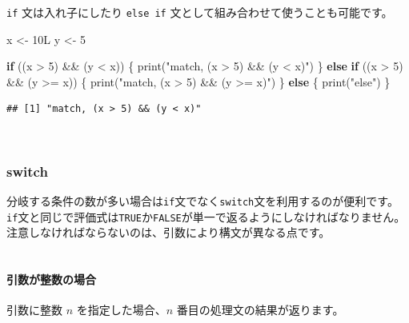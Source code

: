 \documentclass[
  12pt,
]{book}
\newenvironment{Shaded}{\begin{snugshade}}{\end{snugshade}}
\newcommand{\ControlFlowTok}[1]{\textcolor[rgb]{0.13,0.29,0.53}{\textbf{#1}}}
\newcommand{\DecValTok}[1]{\textcolor[rgb]{0.00,0.00,0.81}{#1}}
\newcommand{\FunctionTok}[1]{\textcolor[rgb]{0.00,0.00,0.00}{#1}}
\newcommand{\NormalTok}[1]{#1}
\newcommand{\OtherTok}[1]{\textcolor[rgb]{0.56,0.35,0.01}{#1}}
\newcommand{\SpecialCharTok}[1]{\textcolor[rgb]{0.00,0.00,0.00}{#1}}
\newcommand{\StringTok}[1]{\textcolor[rgb]{0.31,0.60,0.02}{#1}}
\begin{document}
\texttt{if} 文は入れ子にしたり \texttt{else\ if} 文として組み合わせて使うことも可能です。

\begin{Shaded}
\begin{Highlighting}[]
\NormalTok{x }\OtherTok{\textless{}{-}}\NormalTok{ 10L}
\NormalTok{y }\OtherTok{\textless{}{-}} \DecValTok{5}

\ControlFlowTok{if}\NormalTok{ ((x }\SpecialCharTok{\textgreater{}} \DecValTok{5}\NormalTok{) }\SpecialCharTok{\&\&}\NormalTok{ (y }\SpecialCharTok{\textless{}}\NormalTok{ x)) \{}
   \FunctionTok{print}\NormalTok{(}\StringTok{"match, (x \textgreater{} 5) \&\& (y \textless{} x)"}\NormalTok{)}
\NormalTok{\} }\ControlFlowTok{else} \ControlFlowTok{if}\NormalTok{ ((x }\SpecialCharTok{\textgreater{}} \DecValTok{5}\NormalTok{) }\SpecialCharTok{\&\&}\NormalTok{ (y }\SpecialCharTok{\textgreater{}=}\NormalTok{ x)) \{}
   \FunctionTok{print}\NormalTok{(}\StringTok{"match, (x \textgreater{} 5) \&\& (y \textgreater{}= x)"}\NormalTok{)}
\NormalTok{\} }\ControlFlowTok{else}\NormalTok{ \{}
   \FunctionTok{print}\NormalTok{(}\StringTok{"else"}\NormalTok{)}
\NormalTok{\}}
\end{Highlighting}
\end{Shaded}

\begin{verbatim}
## [1] "match, (x > 5) && (y < x)"
\end{verbatim}

　

\hypertarget{switch}{%
\subsubsection{switch}\label{switch}}

分岐する条件の数が多い場合は\texttt{if}文でなく\texttt{switch}文を利用するのが便利です。\texttt{if}文と同じで評価式は\texttt{TRUE}か\texttt{FALSE}が単一で返るようにしなければなりません。注意しなければならないのは、引数により構文が異なる点です。\\
　

\hypertarget{ux5f15ux6570ux304cux6574ux6570ux306eux5834ux5408}{%
\paragraph{引数が整数の場合}\label{ux5f15ux6570ux304cux6574ux6570ux306eux5834ux5408}}

引数に整数 \(n\) を指定した場合、\(n\) 番目の処理文の結果が返ります。
\end{document}
